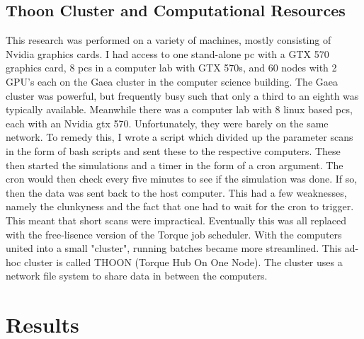 \subsection{Thoon Cluster and Computational Resources}
This research was performed on a variety of machines, mostly consisting of Nvidia graphics cards. I had access to one stand-alone pc with a GTX 570 graphics card, 8 pcs in a computer lab with GTX 570s, and 60 nodes with 2 GPU's each on the Gaea cluster in the computer science building. The Gaea cluster was powerful, but frequently busy such that only a third to an eighth was typically available. Meanwhile there was a computer lab with 8 linux based pcs, each with an Nvidia gtx 570. Unfortunately, they were barely on the same network. To remedy this, I wrote a script which divided up the parameter scans in the form of bash scripts and sent these to the respective computers. These then started the simulations and a timer in the form of a cron argument. The cron would then check every five minutes to see if the simulation was done. If so, then the data was sent back to the host computer. This had a few weaknesses, namely the clunkyness and the fact that one had to wait for the cron to trigger. This meant that short scans were impractical. Eventually this was all replaced with the free-lisence version of the Torque job scheduler. With the computers united into a small "cluster", running batches became more streamlined. This ad-hoc cluster is called THOON (Torque Hub On One Node). The cluster uses a network file system to share data in between the computers.

\section{Results}
